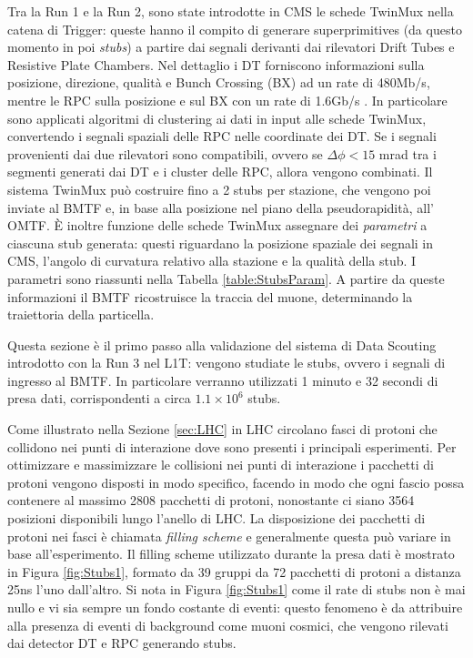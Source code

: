 Tra la Run 1 e la Run 2, sono state introdotte in CMS le schede TwinMux nella catena di Trigger: queste hanno il compito di generare superprimitives (da questo momento in poi \textit{stubs}) a partire dai segnali derivanti dai rilevatori Drift Tubes e Resistive Plate Chambers. \newline
Nel dettaglio i DT forniscono informazioni sulla posizione, direzione, qualità e Bunch Crossing (BX) ad un rate di 480Mb/s, mentre le RPC sulla posizione e sul BX con un rate di 1.6Gb/s \cite{CERNsummerSchool}.\newline
In particolare sono applicati algoritmi di clustering ai dati in input alle schede TwinMux, convertendo i segnali spaziali delle RPC nelle coordinate dei DT. Se i segnali provenienti dai due rilevatori sono compatibili, ovvero se $\Delta \phi < 15$ \si{mrad} tra i segmenti generati dai DT e i cluster delle RPC, allora vengono combinati.
Il sistema TwinMux può costruire fino a 2 stubs per stazione, che vengono poi inviate al BMTF e, in base alla posizione nel piano della pseudorapidità, all' OMTF. \newline
È inoltre funzione delle schede TwinMux assegnare dei \textit{parametri} a ciascuna stub generata: questi riguardano la posizione spaziale dei segnali in CMS, l'angolo di curvatura relativo alla stazione e la qualità della stub. I parametri sono riassunti nella Tabella \ref{table:StubsParam}. A partire da queste informazioni il BMTF ricostruisce la traccia del muone, determinando la traiettoria della particella. 

Questa sezione è il primo passo alla validazione del sistema di Data Scouting introdotto con la Run 3 nel L1T: vengono studiate le stubs, ovvero i segnali di ingresso al BMTF. In particolare verranno utilizzati 1 minuto e 32 secondi di presa dati, corrispondenti a circa $1.1 \times 10^{6}$ stubs. 

Come illustrato nella Sezione \ref{sec:LHC} in LHC circolano fasci di protoni che collidono nei punti di interazione dove sono presenti i principali esperimenti. Per ottimizzare e massimizzare le collisioni nei punti di interazione i pacchetti di protoni vengono disposti in modo specifico, facendo in modo che ogni fascio possa contenere al massimo 2808 pacchetti di protoni, nonostante ci siano 3564 posizioni disponibili lungo l'anello di LHC. La disposizione dei pacchetti di protoni nei fasci è chiamata \textit{filling scheme} e generalmente questa può variare in base all'esperimento. Il filling scheme utilizzato durante la presa dati è mostrato in Figura \ref{fig:Stubs1}, formato da 39 gruppi da 72 pacchetti di protoni a distanza 25ns l'uno dall'altro\cite{Bailey}. \newline
Si nota in Figura \ref{fig:Stubs1} come il rate di stubs non è mai nullo e vi sia sempre un fondo costante di eventi: questo fenomeno è da attribuire alla presenza di eventi di background come muoni cosmici, che vengono rilevati dai detector DT e RPC generando stubs. 



